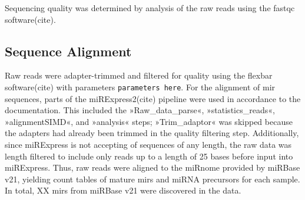 Sequencing quality was determined by analysis of the raw reads using the fastqc software(cite).  

\subsection{Sequence Alignment}
Raw reads were adapter-trimmed and filtered for quality using the flexbar software(cite) with parameters \texttt{parameters here}. For the alignment of \ac{mir} sequences, parts of the miRExpress2(cite) pipeline were used in accordance to the documentation. This included the »Raw\_data\_parse«, »statistics\_reads«, »alignmentSIMD«, and »analysis« steps; »Trim\_adaptor«  was skipped because the adapters had already been trimmed in the quality filtering step. Additionally, since miRExpress is not accepting of sequences of any length, the raw data was length filtered to include only reads up to a length of 25 bases before input into miRExpress. Thus, raw reads were aligned to the miRnome provided by miRBase v21, yielding count tables of mature \acp{mir} and miRNA precursors for each sample. In total, XX \acp{mir} from miRBase v21 were discovered in the data.

